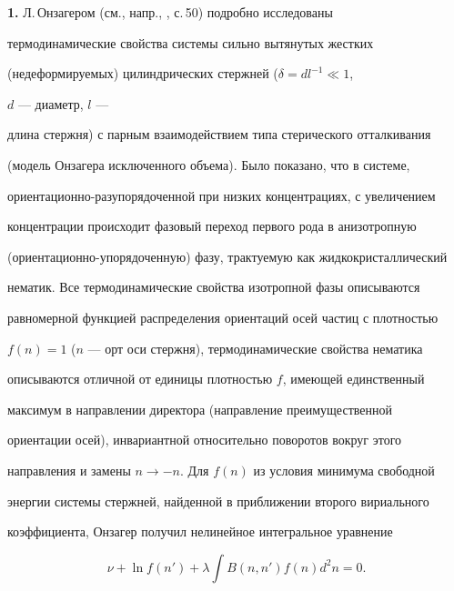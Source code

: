




\maketitle


\label{begin}





{\bf 1.} Л.\,Онзагером (см., напр., \cite{1}, с.\,50) подробно исследованы


термодинамические свойства системы сильно вытянутых жестких


(недеформируемых) цилиндрических стержней ($\delta=dl^{-1}\ll 1$,


$d$ --- диаметр, $l$ ---


длина стержня) с парным взаимодействием типа стерического отталкивания


(модель Онзагера исключенного объема). Было показано, что в системе,


ориентационно-разупорядоченной при низких концентрациях, с увеличением


концентрации происходит фазовый переход первого рода в анизотропную


(ориентационно-упорядоченную) фазу, трактуемую как жидкокристаллический


нематик. Все термодинамические свойства изотропной фазы описываются


равномерной функцией распределения ориентаций осей частиц с плотностью


$f(n)=1$ ($n$ --- орт оси стержня), термодинамические свойства нематика


описываются отличной от единицы плотностью $f$, имеющей единственный


максимум в направлении директора (направление преимущественной


ориентации осей), инвариантной относительно поворотов вокруг этого


направления и замены $n\to-n$. Для $f(n)$ из условия минимума свободной


энергии системы стержней, найденной в приближении второго вириального


коэффициента, Онзагер получил нелинейное интегральное уравнение


\begin{equation}


\nu+\ln f(n')+\lambda\int B(n,n')f(n)d^2n=0.


\tag{1.1}


\end{equation}


